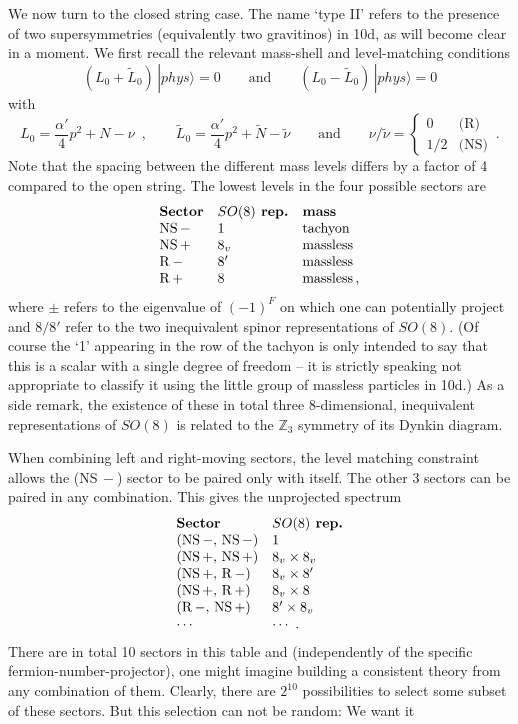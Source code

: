 \documentclass[12pt]{article}
\newcommand{\be}{\begin{equation}}
\newcommand{\ee}{\end{equation}}
\numberwithin{equation}{section}
\begin{document}
We now turn to the closed string case. The name `type II' refers to the presence of two supersymmetries (equivalently two gravitinos) in 10d, as will become clear in a moment. We first recall the relevant mass-shell and level-matching conditions
\be
(L_0+\tilde{L}_0)\,|phys\rangle=0\qquad \mbox{and}\qquad 
(L_0-\tilde{L}_0)\,|phys\rangle=0
\ee
with
\be
L_0=\frac{\alpha'}{4}p^2+N-\nu\,\,\,,\qquad 
\tilde{L}_0=\frac{\alpha'}{4}p^2+\tilde{N}-\tilde{\nu}\qquad\mbox{and}\qquad
\nu/\tilde{\nu}=\left\{\begin{array}{cc}0&\mbox{(R)}\\ 1/2&\mbox{(NS)}
\end{array}\right.\,.
\ee
Note that the spacing between the different mass levels differs by a factor of 4 compared to the open string. The lowest levels in the four possible sectors are
\be
\begin{array}{lll}
\mbox{\bf Sector} & \mbox{\bf $SO(8)$ rep.} & \mbox{\bf mass}
\\
{\rm NS}\,- & 1 & {\rm tachyon}
\\
{\rm NS}\,+ & 8_v & {\rm massless}
\\
{\rm R}\,- & 8' & {\rm massless}
\\
{\rm R}\,+ & 8 & {\rm massless}\,,
\end{array}
\nonumber
\ee
where $\pm$ refers to the eigenvalue of $(-1)^F$ on which one can potentially project and $8/8'$ refer to the two inequivalent spinor representations of $SO(8)$. (Of course the `1' appearing in the row of the tachyon is only intended to say that this is a scalar with a single degree of freedom -- it is strictly speaking not appropriate to classify it using the little group of massless particles in 10d.) As a side remark, the existence of these in total three 8-dimensional, inequivalent representations of $SO(8)$ is related to the $\mathbb{Z}_3$ symmetry of its Dynkin diagram. 

When combining left and right-moving sectors, 
the level matching constraint allows the (NS$\,-$) sector to be paired only with itself. The other 3 sectors can be paired in any combination. This gives the unprojected spectrum
\be
\begin{array}{ll}
\mbox{\bf Sector} & \mbox{\bf $SO(8)$ rep.}
\\
({\rm NS}\,-,\,{\rm NS}\,-) & 1
\\
({\rm NS}\,+,\,{\rm NS}\,+) & 8_v\times 8_v
\\
({\rm NS}\,+,\,{\rm R}\,-) & 8_v\times 8'
\\
({\rm NS}\,+,\,{\rm R}\,+) & 8_v\times 8
\\
({\rm R}\,-,\,{\rm NS}\,+) & 8'\times 8_v
\\
\cdots & \cdots\,\,.
\end{array}
\nonumber
\ee
There are in total 10 sectors in this table and (independently of the specific fermion-number-projector), one might imagine building a consistent theory from any combination of them. Clearly, there are $2^{10}$ possibilities to select some subset of these sectors. But this selection can not be random: We want it 
\end{document}
